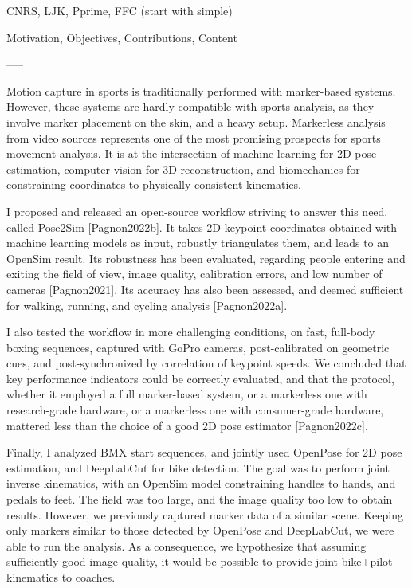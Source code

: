 CNRS, LJK, Pprime, FFC (start with simple)

Motivation,
Objectives,
Contributions,
Content



-----

Motion capture in sports is traditionally performed with marker-based systems. However, these systems are hardly compatible with sports analysis, as they involve marker placement on the skin, and a heavy setup. Markerless analysis from video sources represents one of the most promising prospects for sports movement analysis. It is at the intersection of machine learning for 2D pose estimation, computer vision for 3D reconstruction, and biomechanics for constraining coordinates to physically consistent kinematics. 

I proposed and released an open-source workflow striving to answer this need, called Pose2Sim [Pagnon2022b]. It takes 2D keypoint coordinates obtained with machine learning models as input, robustly triangulates them, and leads to an OpenSim result. Its robustness has been evaluated, regarding people entering and exiting the field of view, image quality, calibration errors, and low number of cameras [Pagnon2021]. Its accuracy has also been assessed, and deemed sufficient for walking, running, and cycling analysis [Pagnon2022a]. 

I also tested the workflow in more challenging conditions, on fast, full-body boxing sequences, captured with GoPro cameras, post-calibrated on geometric cues, and post-synchronized by correlation of keypoint speeds. We concluded that key performance indicators could be correctly evaluated, and that the protocol, whether it employed a full marker-based system, or a markerless one with research-grade hardware, or a markerless one with consumer-grade hardware, mattered less than the choice of a good 2D pose estimator [Pagnon2022c].  

Finally, I analyzed BMX start sequences, and jointly used OpenPose for 2D pose estimation, and DeepLabCut for bike detection. The goal was to perform joint inverse kinematics, with an OpenSim model constraining handles to hands, and pedals to feet. The field was too large, and the image quality too low to obtain results. However, we previously captured marker data of a similar scene. Keeping only markers similar to those detected by OpenPose and DeepLabCut, we were able to run the analysis. As a consequence, we hypothesize that assuming sufficiently good image quality, it would be possible to provide joint bike+pilot kinematics to coaches. 


